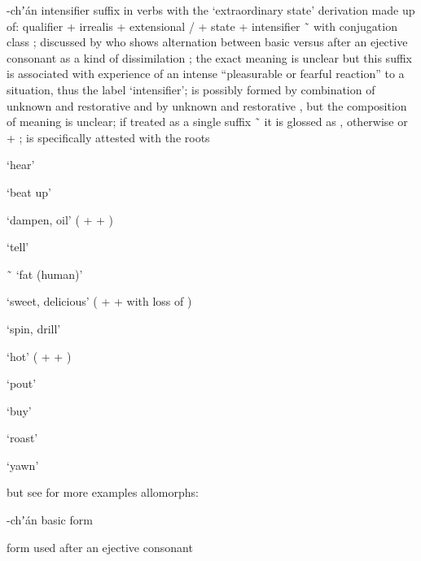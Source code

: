 \begin{morphdesc}[resume*=alphalist]
\item[-chʼán]\label{m:-chʼán}
	intensifier suffix in verbs with the ‘extraordinary state’ derivation
		made up of:
		qualifier 
		+ irrealis 
		+ extensional /
		+ state 
		+ intensifier  \~\ 
		with  conjugation class
		\parencite[655]{crippen:2019};
	discussed by \textcite[56]{story:1966}
		who shows alternation between basic 
		versus  after an ejective consonant as a kind of dissimilation
		\parencite[878]{crippen:2019};
	the exact meaning is unclear but this suffix is associated with experience of
		an intense “pleasurable or fearful reaction” \parencite[56]{story:1966}
		to a situation, thus the label ‘intensifier’;
	 is possibly formed by combination of
		unknown  and restorative 
		and  by unknown  and restorative ,
		but the composition of meaning is unclear;
	if treated as a single suffix  \~\ 
		it is glossed as ,
		otherwise   or  
		+  ;
	 is specifically attested with the roots
		\begin{inlinelist}
		\item	{} ‘hear’
		\item	{} ‘beat up’
		\item	{} ‘dampen, oil’ ( +  + )
		\item	{} ‘tell’
		\item	{} \~\  ‘fat (human)’
		\item	{} ‘sweet, delicious’ ( +  +  with loss of )
		\item	{} ‘spin, drill’
		\item	{} ‘hot’ ( +  + )
		\item	{} ‘pout’
		\item	{} ‘buy’
		\item	{} ‘roast’
		\item	{} ‘yawn’
		\end{inlinelist}
	but see  for more examples
	\newline
	allomorphs:
	\begin{allolist}
	\item[-chʼán]	basic form
	\item[\X{-shán}]	form used after an ejective consonant

\end{allolist}
\end{morphdesc}
